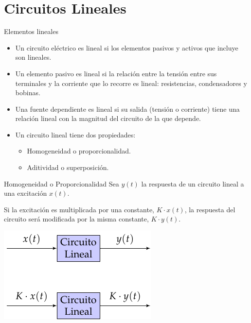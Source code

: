 \documentclass[xcolor={usenames,svgnames,dvipsnames}]{beamer}
\begin{document}
\section{Circuitos Lineales}
\label{sec:org4c2c817}

\begin{frame}[label={sec:org9db9dd8}]{Elementos lineales}
\begin{itemize}
\item Un circuito eléctrico es lineal si los elementos pasivos y activos que incluye son lineales.
\item Un \alert{elemento pasivo} es lineal si la relación entre la tensión entre sus terminales y la corriente que lo recorre es lineal: \alert{resistencias, condensadores y bobinas}.
\item Una \alert{fuente dependiente} es lineal si su salida (tensión o corriente) tiene una relación lineal con la magnitud del circuito de la que depende.
\item Un circuito lineal tiene dos propiedades:
\begin{itemize}
\item Homogeneidad o \alert{proporcionalidad}.
\item Aditividad o \alert{superposición}.
\end{itemize}
\end{itemize}
\end{frame}

\begin{frame}[label={sec:org9fe5621}]{Homogeneidad o Proporcionalidad}
Sea \(y(t)\) la respuesta de un \alert{circuito lineal} a una excitación \(x(t)\). 

Si la excitación es multiplicada por una \alert{constante}, \(K \cdot x(t)\), la respuesta del circuito será modificada por la misma constante, \(K \cdot y(t)\).

\begin{center}
\includegraphics[height=0.5\textheight]{figs/proporcionalidad.pdf}
\end{center}
\end{frame}
\end{document}
